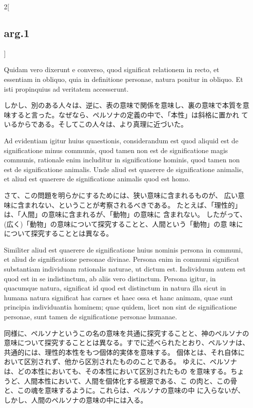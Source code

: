\documentclass[paper=a4paper,fontsize=10pt,jafontsize=9pt,titlepage]{jlreq}
\begin{document}
\begin{paracol}{2}[\subsection{arg.1}]
\switchcolumn*

Quidam vero dixerunt e
converso, quod significat relationem in recto, et essentiam in obliquo,
quia in definitione personae, natura ponitur in obliquo. Et isti
propinquius ad veritatem accesserunt.

\switchcolumn

しかし、別のある人々は、逆に、表の意味で関係を意味し、裏の意味で本質を意
 味すると言った。なぜなら、ペルソナの定義の中で、「本性」は斜格に置かれ
 ているからである。そしてこの人々は、より真理に近づいた。

\switchcolumn*

Ad evidentiam igitur huius
quaestionis, considerandum est quod aliquid est de significatione minus
communis, quod tamen non est de significatione magis communis, rationale
enim includitur in significatione hominis, quod tamen non est de
significatione animalis. 
Unde aliud est quaerere de significatione
animalis, et aliud est quaerere de significatione animalis quod est
homo.

\switchcolumn

さて、この問題を明らかにするためには、狭い意味に含まれるものが、
広い意味に含まれない、ということが考察されるべきである。
 たとえば、「理性的」は、「人間」の意味に含まれるが、「動物」の意味に
 含まれない。
したがって、(広く)「動物」の意味について探究することと、人間という「動物」の意
 味にについて探究することとは異なる。

\switchcolumn*

Similiter aliud est quaerere de significatione huius nominis
persona in communi, et aliud de significatione personae divinae. Persona
enim in communi significat substantiam individuam rationalis naturae, ut
dictum est. 
Individuum autem est quod est in se indistinctum, ab aliis
vero distinctum. Persona igitur, in quacumque natura, significat id quod
est distinctum in natura illa sicut in humana natura significat has
carnes et haec ossa et hanc animam, quae sunt principia individuantia
hominem; quae quidem, licet non sint de significatione personae, sunt
tamen de significatione personae humanae.

\switchcolumn

同様に、ペルソナというこの名の意味を共通に探究することと、神のペルソナの
 意味について探究することとは異なる。すでに述べられたとおり、ペルソナは、
 共通的には、理性的本性をもつ個体的実体を意味する。
個体とは、それ自体において区別されず、他から区別されたもののことである。
 ゆえに、ペルソナは、どの本性においても、その本性において区別されたもの
 を意味する。ちょうど、人間本性において、人間を個体化する根源である、こ
 の肉と、この骨と、この魂を意味するように。これらは、ペルソナの意味の中
 に入らないが、しかし、人間のペルソナの意味の中には入る。


\end{paracol}
\end{document}
